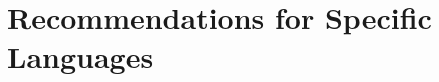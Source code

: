 \documentclass[10pt,letter]{article}
\begin{document}
\begin{comment}
Also, other code templates are available. The ``CodeTests'' class is used to test our standards for code structure. The ``Javadoc'' class contains a list of all Javadoc tags defined in this document. You can load this up into your editor and cut and paste from it when writing new documentation.
\begin{itemize}
  \item Code Tests class
  \item Javadoc class
\end{itemize}

The Javadoc documentation generated from all of the above classes is also available.
\subsection{Eiffel Examples}
A single class template is available that highlights many of the recommendations made in this code standard.
\end{comment}

\section{Recommendations for Specific Languages}












\end{document}
